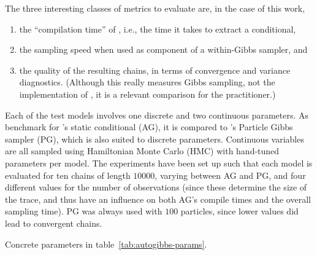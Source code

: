 The three interesting classes of metrics to evaluate are, in the case of this work,
\begin{enumerate}
  \firmlist
\item the \enquote{compilation time} of \autogibbsjl{}, i.e., the time it takes to extract a
  conditional,
\item the sampling speed when used as component of a within-Gibbs sampler, and
\item the quality of the resulting chains, in terms of convergence and variance diagnostics.
  (Although this really measures Gibbs sampling, not the implementation of \autogibbsjl{}, it is a
  relevant comparison for the practitioner.)
\end{enumerate}
Each of the test models involves one discrete and two continuous parameters.  As benchmark for
\autogibbsjl{}'s static conditional (AG), it is compared to \turingjl{}'s Particle Gibbs sampler
(PG), which is also suited to discrete parameters.  Continuous variables are all sampled using
Hamiltonian Monte Carlo (HMC) with hand-tuned parameters per model.  The experiments have been set
up such that each model is evaluated for ten chains of length \(10000\), varying between AG and PG,
and four different values for the number of observations (since these determine the size of the
trace, and thus have an influence on both AG's compile times and the overall sampling time).  PG was
always used with \(100\) particles, since lower values did lead to convergent chains.

Concrete parameters in table~\ref{tab:autogibbs-params}.

